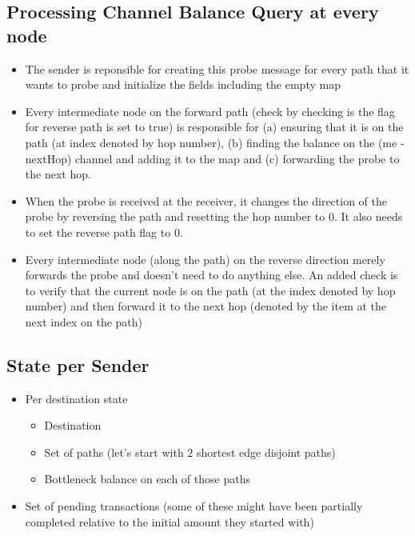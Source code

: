\documentclass[a4paper]{article}
\begin{document}
\subsection{Processing Channel Balance Query at every node}
\begin{itemize}
    \item The sender is reponsible for creating this probe message for every path that it wants to probe and initialize the fields including the empty map
    \item Every intermediate node on the forward path (check by checking is the flag for reverse path is set to true) 
        is responsible for (a) ensuring that it is on the path (at index denoted by hop number), (b) finding
        the balance on the (me - nextHop) channel and adding it to the map and (c) forwarding the probe to the next hop. 
    \item When the probe is received at the receiver, it changes the direction of the probe by reversing the path and resetting the hop number to $0$. It also
        needs to set the reverse path flag to $0$.
    \item Every intermediate node (along the path) on the reverse direction merely forwards the probe and doesn't need to do anything else. An added check is to
        verify that the current node is on the path (at the index denoted by hop number) and then forward it to the next hop (denoted by the item at the next index
        on the path)
\end{itemize}

\subsection{State per Sender}
\begin{itemize}
    \item Per destination state
        \begin{itemize}
            \item Destination
            \item Set of paths (let's start with $2$ shortest edge disjoint paths)
            \item Bottleneck balance on each of those paths
        \end{itemize}
    \item Set of pending transactions (some of these might have been partially completed relative to the initial amount they started with)
\end{itemize}
\end{document}
